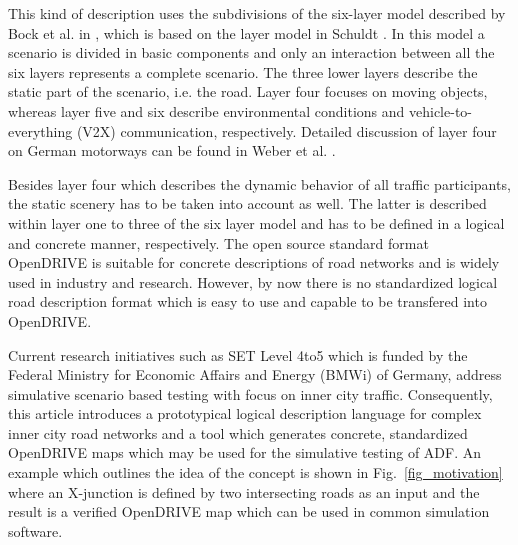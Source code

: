 \documentclass[a4paper, 10pt, conference]{ieeeconf}      %
\begin{document}
This kind of description uses the subdivisions of the six-layer model described by Bock et al. in \cite{bock2018data}, which is based on the layer model in Schuldt \cite{schuldt2017beitrag}. In this model a scenario is divided in basic components and only an interaction between all the six layers represents a complete scenario. The three lower layers describe the static part of the scenario, i.e. the road. Layer four focuses on moving objects, whereas layer five and six describe environmental conditions and vehicle-to-everything (V2X) communication, respectively. Detailed discussion of layer four on German motorways can be found in Weber et al. \cite{weber2019framework}.

Besides layer four which describes the dynamic behavior of all traffic participants, the static scenery has to be taken into account as well. The latter is described within layer one to three of the six layer model and has to be defined in a logical and concrete manner, respectively. The open source standard format OpenDRIVE \cite{odr1.5} is suitable for concrete descriptions of road networks and is widely used in industry and research. However, by now there is no standardized logical road description format which is easy to use and capable to be transfered into OpenDRIVE.

Current research initiatives such as SET Level 4to5 which is funded by the Federal Ministry for Economic Affairs and Energy (BMWi) of Germany, address simulative scenario based testing with focus on inner city traffic. Consequently, this article introduces a prototypical logical description language for complex inner city road networks and a tool which generates concrete, standardized OpenDRIVE maps which may be used for the simulative testing of ADF. An example which outlines the idea of the concept is shown in Fig.~\ref{fig_motivation} where an X-junction is defined by two intersecting roads as an input and the result is a verified OpenDRIVE map which can be used in common simulation software.
\end{document}
